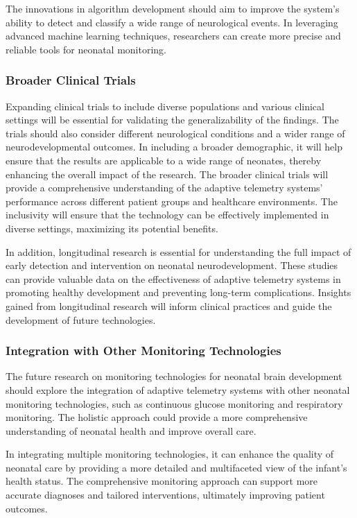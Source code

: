 \documentclass[12pt,journal,compsoc]{IEEEtran}
\begin{document}
The innovations in algorithm development should aim to improve the system's ability to detect and classify a wide range of neurological events. In leveraging advanced machine learning techniques, researchers can create more precise and reliable tools for neonatal monitoring.  

\subsubsection{Broader Clinical Trials}

Expanding clinical trials to include diverse populations and various clinical settings will be essential for validating the generalizability of the findings. The trials should also consider different neurological conditions and a wider range of neurodevelopmental outcomes. In including a broader demographic, it will help ensure that the results are applicable to a wide range of neonates, thereby enhancing the overall impact of the research. The broader clinical trials will provide a comprehensive understanding of the adaptive telemetry systems' performance across different patient groups and healthcare environments. The inclusivity will ensure that the technology can be effectively implemented in diverse settings, maximizing its potential benefits.  

In addition, longitudinal research is essential for understanding the full impact of early detection and intervention on neonatal neurodevelopment. These studies can provide valuable data on the effectiveness of adaptive telemetry systems in promoting healthy development and preventing long-term complications. Insights gained from longitudinal research will inform clinical practices and guide the development of future technologies.

\subsubsection{Integration with Other Monitoring Technologies}

The future research on monitoring technologies for neonatal brain development should explore the integration of adaptive telemetry systems with other neonatal monitoring technologies, such as continuous glucose monitoring and respiratory monitoring. The holistic approach could provide a more comprehensive understanding of neonatal health and improve overall care. 

In integrating multiple monitoring technologies, it can enhance the quality of neonatal care by providing a more detailed and multifaceted view of the infant's health status. The comprehensive monitoring approach can support more accurate diagnoses and tailored interventions, ultimately improving patient outcomes.  
\end{document}
